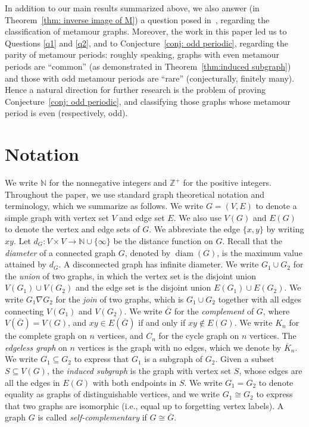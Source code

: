 \documentclass[12pt]{amsart}
\theoremstyle{definition}
\theoremstyle{remark}
\numberwithin{equation}{section}
\numberwithin{figure}{section}
\newcommand{\diam}{\operatorname{diam}}
\newcommand{\N}{\mathbb{N}}
\newcommand{\Z}{\mathbb{Z}}
\begin{document}
In addition to our main results summarized above, we also answer (in Theorem~\ref{thm: inverse image of M}) a question posed in~\cite[Question~10.5]{GaarKrenn2023}, regarding the classification of metamour graphs. 
Moreover, the work in this paper led us to Questions \ref{q1} and \ref{q2}, and to
Conjecture~\ref{conj: odd periodic}, regarding the parity of metamour periods: roughly speaking, graphs with even metamour periods are ``common'' (as demonstrated in Theorem~\ref{thm:induced subgraph}) and those with odd metamour periods are ``rare'' (conjecturally, finitely many).
Hence a natural direction for further research is the problem of proving Conjecture~\ref{conj: odd periodic}, and classifying those graphs whose metamour period is even (respectively, odd).

\section{Notation}

We write $\N$ for the nonnegative integers and $\Z^+$ for the positive integers. 
Throughout the paper, we use standard graph theoretical notation and terminology, which we summarize as follows.
We write $G=(V,E)$ to denote a simple graph with vertex set $V$ and edge set $E$.
We also use $V(G)$ and $E(G)$ to denote the vertex and edge sets of $G$.
We abbreviate the edge $\{x,y\}$ by writing $xy$.
Let 
$d_G:V\times V\rightarrow \N \cup \{\infty\}$
be the distance function on $G$. 
Recall that the \emph{diameter} of a connected graph $G$, denoted by $\diam(G)$, is the maximum value attained by $d_G$. A disconnected graph has infinite diameter.
We write $G_1 \cup G_2$ for the \emph{union} of two graphs, in which the vertex set is the disjoint union $V(G_1) \cup V(G_2)$ and the edge set is the disjoint union $E(G_1) \cup E(G_2)$.
We write $G_1 \nabla G_2$ for the \emph{join} of two graphs, which is $G_1 \cup G_2$ together with all edges connecting $V(G_1)$ and $V(G_2)$.
We write $\overline{G}$ for the \emph{complement} of $G$, where $V(\overline{G})=V(G)$, and $xy \in E(\overline{G})$ if and only if $xy \not\in E(G)$.
We write $K_n$ for the complete graph on $n$ vertices, and $C_n$ for the cycle graph on $n$ vertices.
The \emph{edgeless graph} on $n$ vertices is the graph with no edges, which we denote by $\overline{K}_n$.
We write $G_1 \subseteq G_2$ to express that $G_1$ is a subgraph of $G_2$.
Given a subset $S \subseteq V(G)$, the \emph{induced subgraph} is the graph with vertex set $S$, whose edges are all the edges in $E(G)$ with both endpoints in $S$.
We write $G_1 = G_2$ to denote equality as graphs of distinguishable vertices, and we write $G_1 \cong G_2$ to express that two graphs are isomorphic (i.e., equal up to forgetting vertex labels). A graph $G$ is called \emph{self-complementary} if $G\cong \overline{G}$.
\end{document}
